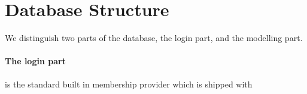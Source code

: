 \section{Database Structure}
\label{sec:database_structure}

We distinguish two parts of the database, the login part, and the modelling part.

\paragraph{The login part} is the standard built in membership provider which is shipped with 